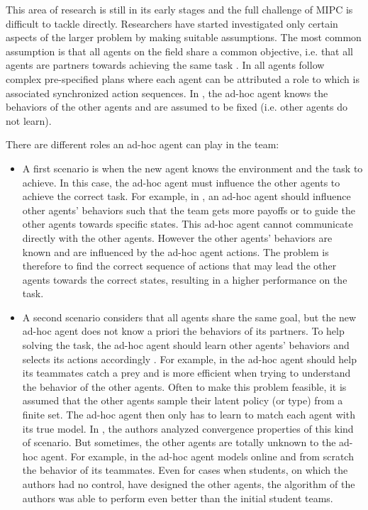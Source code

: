 This area of research is still in its early stages and the full challenge of MIPC is difficult to tackle directly. Researchers have started investigated only certain aspects of the larger problem by making suitable assumptions. The most common assumption is that all agents on the field share a common objective, i.e. that all agents are partners towards achieving the same task \cite{barrett2011empirical}. In \cite{bowling2005coordination,gil2006dynamically} all agents follow complex pre-specified plans where each agent can be attributed a role to which is associated synchronized action sequences. In \cite{stone2010teach,stone2013teaching}, the ad-hoc agent knows the behaviors of the other agents and are assumed to be fixed (i.e. other agents do not learn).

There are different roles an ad-hoc agent can play in the team:

\begin{itemize}

\item A first scenario is when the new agent knows the environment and the task to achieve. In this case, the ad-hoc agent must influence the other agents to achieve the correct task. For example, in  \cite{stone2010teach,stone2013teaching}, an ad-hoc agent should influence other agents' behaviors such that the team gets more payoffs or to guide the other agents towards specific states. This ad-hoc agent cannot communicate directly with the other agents. However the other agents' behaviors are known and are influenced by the ad-hoc agent actions. The problem is therefore to find the correct sequence of actions that may lead the other agents towards the correct states, resulting in a higher performance on the task. 

\item A second scenario considers that all agents share the same goal, but the new ad-hoc agent does not know a priori the behaviors of its partners. To help solving the task, the ad-hoc agent should learn other agents' behaviors and selects its actions accordingly  \cite{barrett2011adhoc,barrett2011empirical,barrett2013team}. For example, in \cite{barrett2011empirical} the ad-hoc agent should help its teammates catch a prey and is more efficient when trying to understand the behavior of the other agents. Often to make this problem feasible, it is assumed that the other agents sample their latent policy (or type) from a finite set. The ad-hoc agent then only has to learn to match each agent with its true model. In \cite{albrecht2014uai}, the authors analyzed convergence properties of this kind of scenario. But sometimes, the other agents are totally unknown to the ad-hoc agent. For example, in \cite{barrett2011empirical} the ad-hoc agent models online and from scratch the behavior of its teammates. Even for cases when students, on which the authors had no control, have designed the other agents, the algorithm of the authors was able to perform even better than the initial student teams.

\end{itemize}

